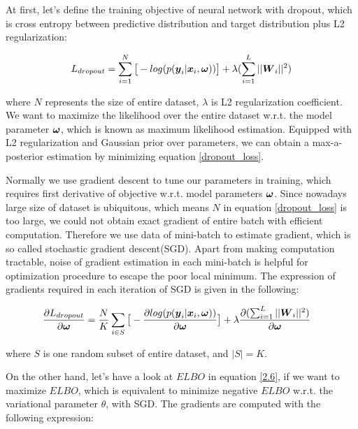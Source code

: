 At first, let's define the training objective of neural network with dropout, which is cross entropy between predictive distribution and target distribution plus L2 regularization:

\begin{equation}
\begin{aligned} \label{dropout_loss}
L_{dropout}   = \sum_{i=1}^{N}\big[-log(p(\boldsymbol y_{i}| \boldsymbol x_{i}, \boldsymbol \omega))\big] + \lambda(\sum_{i=1}^{L} ||\boldsymbol W_{i}||^{2})
\end{aligned}
\end{equation}

where $N$ represents the size of entire dataset, $\lambda$ is L2 regularization coefficient. We want to maximize the likelihood over the entire dataset w.r.t. the model parameter $\boldsymbol \omega$, which is known as maximum likelihood estimation. Equipped with L2 regularization and Gaussian prior over parameters, we can obtain a max-a-posterior estimation by minimizing equation \ref{dropout_loss}. 

Normally we use gradient descent to tune our parameters in training, which requires first derivative of objective w.r.t. model parameters $\boldsymbol \omega$. Since nowadays large size of dataset is ubiquitous, which means $N$ in equation \ref{dropout_loss} is too large, we could not obtain exact gradient of entire batch with efficient computation. Therefore we use data of mini-batch to estimate gradient, which is so called stochastic gradient descent(SGD). Apart from making computation tractable, noise of gradient estimation in each mini-batch is helpful for optimization procedure to escape the poor local minimum. The expression of gradients required in each iteration of SGD is given in the following:

\begin{equation}
\begin{aligned} \label{dropout_grad}
\frac{\partial L_{dropout}}{\partial \boldsymbol \omega} &=\frac{N}{K}\sum_{i \in S}\big[-\frac{\partial log(p(\boldsymbol y_{i}| \boldsymbol x_{i}, \boldsymbol \omega))}{\partial \boldsymbol \omega}\big] + \lambda\frac{\partial (\sum_{i=1}^{L} ||\boldsymbol W_{i}||^{2})}{\partial \boldsymbol \omega}
\end{aligned}
\end{equation}

where $S$ is one random subset of entire dataset, and $|S| = K$.

On the other hand, let's have a look at $ELBO$ in equation \ref{2.6}, if we want to maximize $ELBO$, which is equivalent to minimize negative $ELBO$ w.r.t. the variational parameter $\theta$, with SGD. The gradients are computed with the following expression:

